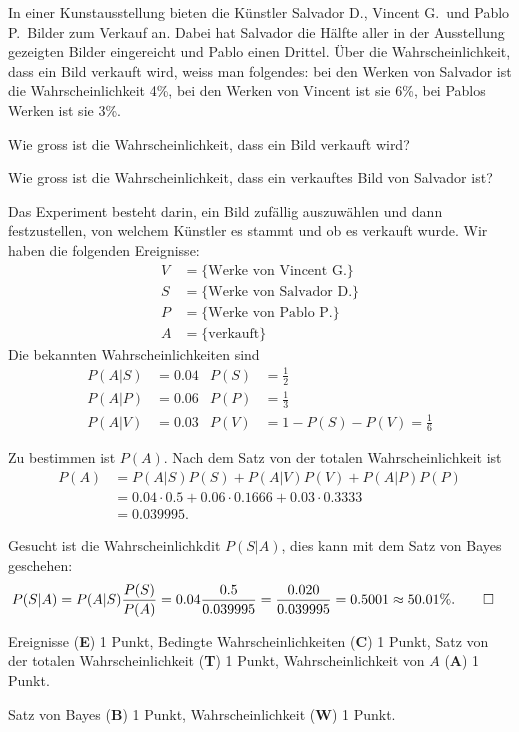 In einer Kunstausstellung bieten die Künstler Salvador D., Vincent G.~und
Pablo P.~Bilder zum Verkauf an.
Dabei hat Salvador die Hälfte aller in der Ausstellung gezeigten
Bilder eingereicht und Pablo einen Drittel.
Über die Wahrscheinlichkeit, dass ein Bild verkauft wird, weiss
man folgendes: bei den Werken von Salvador ist die Wahrscheinlichkeit
4\%, bei den Werken von Vincent ist sie 6\%, bei Pablos Werken ist sie 3\%.
\begin{teilaufgaben}
\item Wie gross ist die Wahrscheinlichkeit, dass ein Bild verkauft wird?
\item Wie gross ist die Wahrscheinlichkeit, dass ein verkauftes
Bild von Salvador ist?
\end{teilaufgaben}

\begin{loesung}
Das Experiment besteht darin, ein Bild zufällig auszuwählen und dann
festzustellen, von welchem Künstler es stammt und ob es verkauft wurde.
Wir haben die folgenden Ereignisse:
\begin{align*}
V&=\{\text{Werke von Vincent~G.}\}\\
S&=\{\text{Werke von Salvador~D.}\}\\
P&=\{\text{Werke von Pablo~P.}\}\\
A&=\{\text{verkauft}\}
\end{align*}
Die bekannten Wahrscheinlichkeiten sind
\begin{align*}
P(A|S)&=0.04 & P(S)&=\frac12\\
P(A|P)&=0.06 & P(P)&=\frac13\\
P(A|V)&=0.03 & P(V)&=1-P(S)-P(V) = \frac16
\end{align*}
\begin{teilaufgaben}
\item
Zu bestimmen ist $P(A)$.
Nach dem Satz von der totalen Wahrscheinlichkeit ist
\begin{align*}
P(A)
&=
P(A|S)P(S)
+
P(A|V)P(V)
+
P(A|P)P(P)
\\
&=
0.04\cdot 0.5
+
0.06\cdot 0.1666
+
0.03\cdot 0.3333
\\
&=0.039995.
\end{align*}
\item
Gesucht ist die Wahrscheinlichkdit $P(S|A)$, dies kann mit dem 
Satz von Bayes geschehen:
\begin{align*}
P(S|A)
&=
P(A|S)\frac{P(S)}{P(A)}
=
0.04\frac{0.5}{0.039995}
=
\frac{0.020}{0.039995}
=
0.5001
\approx
50.01\%.
\qedhere
\end{align*}
\end{teilaufgaben}
\end{loesung}

\begin{bewertung}
\begin{teilaufgaben}
\item
Ereignisse ({\bf E})  1 Punkt,
Bedingte Wahrscheinlichkeiten ({\bf C}) 1 Punkt,
Satz von der totalen Wahrscheinlichkeit ({\bf T}) 1 Punkt,
Wahrscheinlichkeit von $A$ ({\bf A}) 1 Punkt.
\item
Satz von Bayes ({\bf B}) 1 Punkt,
Wahrscheinlichkeit ({\bf W}) 1 Punkt.
\end{teilaufgaben}
\end{bewertung}
